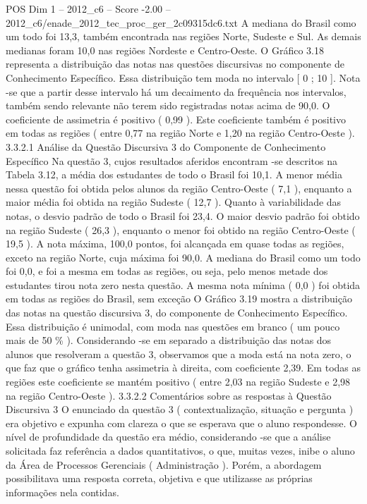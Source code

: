 \begin{textsample}{POS Dim 1 – 2012\_c6 – Score -2.00 – 2012\_c6/enade\_2012\_tec\_proc\_ger\_2c09315dc6.txt}
A mediana do Brasil como um todo foi 13,3, também encontrada nas regiões Norte, Sudeste e Sul.
As demais medianas foram 10,0 nas regiões Nordeste e Centro-Oeste.
O Gráfico 3.18 representa a distribuição das notas nas questões discursivas no componente de Conhecimento Específico.
Essa distribuição tem moda no intervalo [ 0 ; 10 ].
Nota -se que a partir desse intervalo há um decaimento da frequência nos intervalos, também sendo relevante não terem sido registradas notas acima de 90,0.
O coeficiente de assimetria é positivo ( 0,99 ).
Este coeficiente também é positivo em todas as regiões ( entre 0,77 na região Norte e 1,20 na região Centro-Oeste ). 3.3.2.1 Análise da Questão Discursiva 3 do Componente de Conhecimento Específico Na questão 3, cujos resultados aferidos encontram -se descritos na Tabela 3.12, a média dos estudantes de todo o Brasil foi 10,1.
A menor média nessa questão foi obtida pelos alunos da região Centro-Oeste ( 7,1 ), enquanto a maior média foi obtida na região Sudeste ( 12,7 ).
Quanto à variabilidade das notas, o desvio padrão de todo o Brasil foi 23,4.
O maior desvio padrão foi obtido na região Sudeste ( 26,3 ), enquanto o menor foi obtido na região Centro-Oeste ( 19,5 ).
A nota máxima, 100,0 pontos, foi alcançada em quase todas as regiões, exceto na região Norte, cuja máxima foi 90,0.
A mediana do Brasil como um todo foi 0,0, e foi a mesma em todas as regiões, ou seja, pelo menos metade dos estudantes tirou nota zero nesta questão.
A mesma nota mínima ( 0,0 ) foi obtida em todas as regiões do Brasil, sem exceção O Gráfico 3.19 mostra a distribuição das notas na questão discursiva 3, do componente de Conhecimento Específico.
Essa distribuição é unimodal, com moda nas questões em branco ( um pouco mais de 50 \% ).
Considerando -se em separado a distribuição das notas dos alunos que resolveram a questão 3, observamos que a moda está na nota zero, o que faz que o gráfico tenha assimetria à direita, com coeficiente 2,39.
Em todas as regiões este coeficiente se mantém positivo ( entre 2,03 na região Sudeste e 2,98 na região Centro-Oeste ). 3.3.2.2 Comentários sobre as respostas à Questão Discursiva 3 O enunciado da questão 3 ( contextualização, situação e pergunta ) era objetivo e expunha com clareza o que se esperava que o aluno respondesse.
O nível de profundidade da questão era médio, considerando -se que a análise solicitada faz referência a dados quantitativos, o que, muitas vezes, inibe o aluno da Área de Processos Gerenciais ( Administração ).
Porém, a abordagem possibilitava uma resposta correta, objetiva e que utilizasse as próprias informações nela contidas.

\end{textsample}
